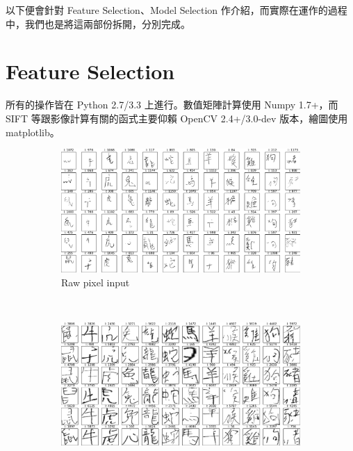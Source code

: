 
以下便會針對 Feature Selection、Model Selection 作介紹，而實際在運作的過程中，我們也是將這兩部份拆開，分別完成。

\section{Feature Selection}
所有的操作皆在 Python 2.7/3.3 上進行。數值矩陣計算使用 Numpy 1.7+，而 SIFT 等跟影像計算有關的函式主要仰賴 OpenCV 2.4+/3.0-dev 版本，繪圖使用 matplotlib。

\begin{figure}[htb]
    \centering
    \begin{subfigure}[b]{0.48\textwidth}
        \centering
        \includegraphics[scale=0.23]{../results/figs/train_pixelview_combined_6}
        \caption{Raw pixel input}
        \label{fig:px-raw}
    \end{subfigure}%
    ~
    \begin{subfigure}[b]{0.48\textwidth}
        \centering
        \includegraphics[scale=0.23]{../results/figs/train_pixelview_allzoidac_60x60_6}

\end{subfigure}
\end{figure}
